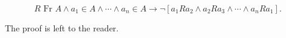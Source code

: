 $$R \text{ Fr } A \wedge a_1 \in A \wedge \cdots \wedge a_n \in A \rightarrow \neg [a_1 R a_2 \wedge a_2 R a_3 \wedge \cdots \wedge a_n R a_1].$$

The proof is left to the reader.
